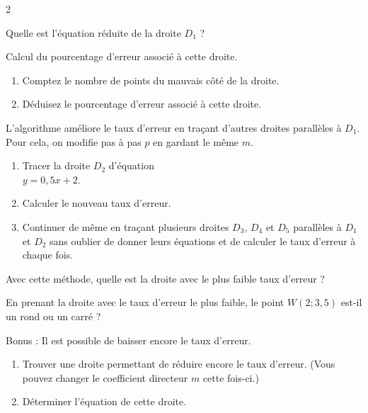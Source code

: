 	\begin{multicols}{2}

		\begin{MADenumerate}
			\item Quelle est l'équation réduite de la droite $D_1$ ?

			\item Calcul du pourcentage d'erreur associé à cette droite.
			\begin{enumerate}
				\item Comptez le nombre de points du mauvais côté de la droite.
				\item Déduisez le pourcentage d'erreur associé à cette droite.

			\end{enumerate}
			\item L'algorithme améliore le taux d'erreur en traçant d'autres droites parallèles à $D_1$. Pour cela, on modifie pas à pas $p$ en gardant le même $m$.
			\begin{enumerate}
				\item Tracer la droite $D_2$ d'équation \\$y=0{,}5x+2$.
				\item Calculer le nouveau taux d'erreur.
				\item Continuer de même en traçant plusieurs droites $D_3$, $D_4$ et $D_5$ parallèles à $D_1$ et $D_2$ sans oublier de donner leurs équations et de calculer le taux d'erreur à chaque fois.

			\end{enumerate}
			\item  Avec cette méthode, quelle est la droite avec le plus faible taux d'erreur ?
			\item En prenant la droite avec le taux d'erreur le plus faible, le point $W(2;3{,}5)$ est-il un rond ou un carré ?

			\item Bonus : Il est possible de baisser encore le taux d'erreur.
			\begin{enumerate}
				\item Trouver une droite permettant de réduire encore le taux d'erreur. (Vous pouvez changer le coefficient directeur $m$ cette fois-ci.)
				\item Déterminer l'équation de cette droite.
			\end{enumerate}

		\end{MADenumerate}

	\end{multicols}
